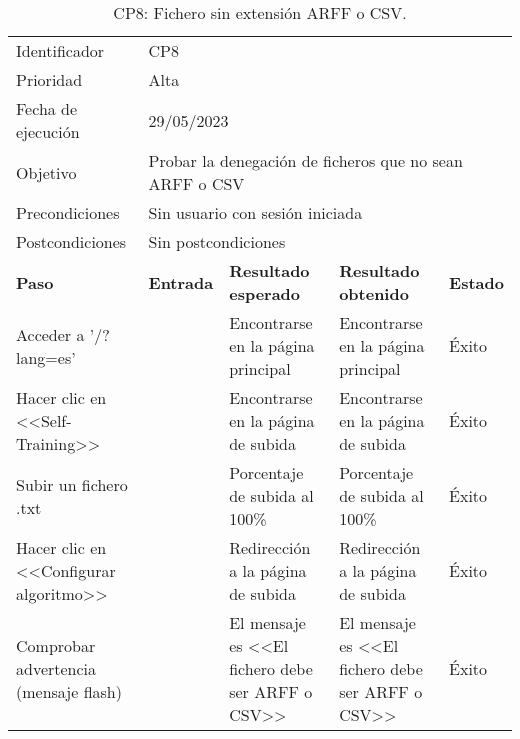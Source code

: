     \begin{center}
    \begin{table}[H]
    \begin{tabular}{p{}p{}p{}p{}p{}}
    \rowcolor{gray!25}
    Identificador   & \multicolumn{4}{l}{CP8}                                                   \\
    Prioridad   & \multicolumn{4}{l}{Alta}                                                    \\
    \rowcolor{gray!25}
    Fecha de ejecución   & \multicolumn{4}{l}{29/05/2023}                                                    \\
    Objetivo        & \multicolumn{4}{p{0.80\textwidth}}{Probar la denegación de ficheros que no sean ARFF o CSV}                                                     \\
    \rowcolor{gray!25}
    Precondiciones  & \multicolumn{4}{l}{Sin usuario con sesión iniciada}                                                     \\
    Postcondiciones & \multicolumn{4}{l}{Sin postcondiciones}                                                     \\ \hline
    \rowcolor{gray!25}
    \textbf{Paso}   & \textbf{Entrada} & \textbf{Resultado esperado} & \textbf{Resultado obtenido} & \textbf{Estado} \\ \hline
    Acceder a '/?lang=es'                                 &                        & Encontrarse en la página principal                                   & Encontrarse en la página principal                                   & Éxito  \\ \hline
    Hacer clic en <<Self-Training>>                       &                        & Encontrarse en la página de subida                                   & Encontrarse en la página de subida                                & Éxito                            \\ \hline
    Subir un fichero .txt                                 &                        & Porcentaje de subida al 100\%                                        & Porcentaje de subida al 100\%                                & Éxito                            \\ \hline
    Hacer clic en <<Configurar algoritmo>>                &                        & Redirección a la página de subida                                    & Redirección a la página de subida                                 & Éxito                            \\ \hline
    Comprobar advertencia (mensaje flash)                 &                        & El mensaje es <<El fichero debe ser ARFF o CSV>>                     & El mensaje es <<El fichero debe ser ARFF o CSV>>                                 & Éxito  \\ \hline 
    \end{tabular}
    \caption{CP8: Fichero sin extensión ARFF o CSV.}
    \end{table}
    \end{center}
    
